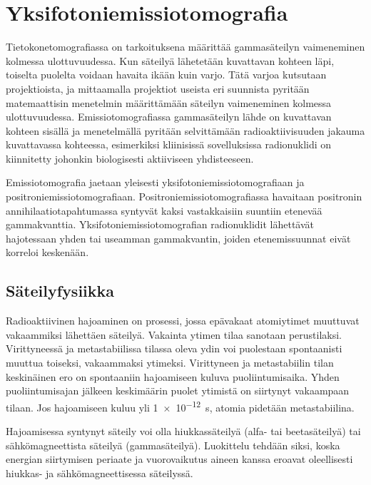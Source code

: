 \section{Yksifotoniemissiotomografia}
Tietokonetomografiassa on tarkoituksena määrittää gammasäteilyn vaimeneminen kolmessa ulottuvuudessa. Kun säteilyä lähetetään kuvattavan kohteen läpi, toiselta puolelta voidaan havaita ikään kuin varjo. Tätä varjoa kutsutaan projektioista, ja mittaamalla projektiot useista eri suunnista pyritään matemaattisin menetelmin määrittämään säteilyn vaimeneminen kolmessa ulottuvuudessa. Emissiotomografiassa gammasäteilyn lähde on kuvattavan kohteen sisällä ja menetelmällä pyritään selvittämään radioaktiivisuuden jakauma kuvattavassa kohteessa\cite{bruyant_analytic_2002, cherry_gamma_2012, van_audenhaege_review_2015}, esimerkiksi kliinisissä sovelluksissa radionuklidi on kiinnitetty johonkin biologisesti aktiiviseen yhdisteeseen\cite{cherry_single_2012, van_audenhaege_review_2015, bruyant_analytic_2002}.

Emissiotomografia jaetaan yleisesti yksifotoniemissiotomografiaan ja positroniemissiotomografiaan. Positroniemissiotomografiassa havaitaan positronin annihilaatiotapahtumassa syntyvät kaksi vastakkaisiin suuntiin etenevää gammakvanttia\cite{cherry_single_2012}. Yksifotoniemissiotomografian radionuklidit lähettävät hajotessaan yhden tai useamman gammakvantin, joiden etenemissuunnat eivät korreloi keskenään\cite{cherry_single_2012, van_audenhaege_review_2015}.

\subsection{Säteilyfysiikka}
Radioaktiivinen hajoaminen on prosessi, jossa epävakaat atomiytimet muuttuvat vakaammiksi lähettäen säteilyä. Vakainta ytimen tilaa sanotaan perustilaksi. Virittyneessä ja metastabiilissa tilassa oleva ydin voi puolestaan spontaanisti muuttua toiseksi, vakaammaksi ytimeksi. Virittyneen ja metastabiilin tilan keskinäinen ero on spontaaniin hajoamiseen kuluva puoliintumisaika. Yhden puoliintumisajan jälkeen keskimäärin puolet ytimistä on siirtynyt vakaampaan tilaan. Jos hajoamiseen kuluu yli \qty{1e-12}{\second}, atomia pidetään metastabiilina\cite{cherry_basic_2012}.

Hajoamisessa syntynyt säteily voi olla hiukkassäteilyä (alfa- tai beetasäteilyä) tai sähkömagneettista säteilyä (gammasäteilyä).\cite{cherry_basic_2012, cherry_interaction_2012} Luokittelu tehdään siksi, koska energian siirtymisen periaate ja vuorovaikutus aineen kanssa eroavat oleellisesti hiukkas- ja sähkömagneettisessa säteilyssä.

